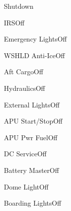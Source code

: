 \documentclass[sim-use]{checklist}
\begin{document}
\begin{checklist}{Shutdown} 
    \item{IRS}{Off}
    \item{Emergency Lights}{Off}
    \item{WSHLD Anti-Ice}{Off}
    \item{Aft Cargo}{Off}
    \item{Hydraulics}{Off}
    \item{External Lights}{Off}
    \item{APU Start/Stop}{Off}
    \item{APU Pwr Fuel}{Off}
    \item{DC Service}{Off}
    \item{Battery Master}{Off}
    \item{Dome Light}{Off}
    \item{Boarding Lights}{Off}
\end{checklist}
\end{document}
